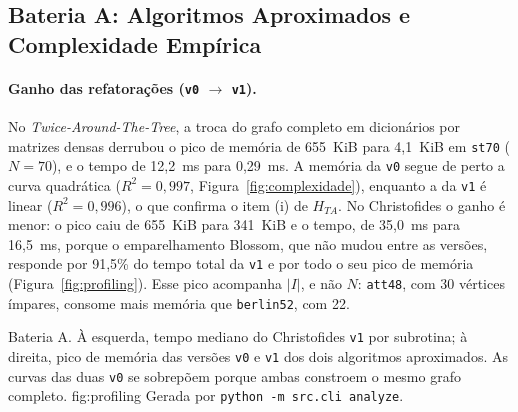 \subsection{Bateria A: Algoritmos Aproximados e Complexidade Empírica}
\label{sec:res_aproximados}

\paragraph{Ganho das refatorações (\texttt{v0} $\rightarrow$ \texttt{v1}).}
No \textit{Twice-Around-The-Tree}, a troca do grafo completo em dicionários por matrizes densas
derrubou o pico de memória de 655~KiB para 4,1~KiB em \texttt{st70} ($N = 70$), e o tempo de
12,2~ms para 0,29~ms. A memória da \texttt{v0} segue de perto a curva quadrática
($R^2 = 0{,}997$, Figura~\ref{fig:complexidade}), enquanto a da \texttt{v1} é linear
($R^2 = 0{,}996$), o que confirma o item (i) de $H_{TA}$. No Christofides o ganho é menor: o
pico caiu de 655~KiB para 341~KiB e o tempo, de 35,0~ms para 16,5~ms, porque o emparelhamento
Blossom, que não mudou entre as versões, responde por 91,5\% do tempo total da \texttt{v1} e por
todo o seu pico de memória (Figura~\ref{fig:profiling}). Esse pico acompanha $|I|$, e não $N$:
\texttt{att48}, com 30 vértices ímpares, consome mais memória que \texttt{berlin52}, com 22.

{Bateria A. À esquerda, tempo mediano do Christofides \texttt{v1} por subrotina; à direita, pico
de memória das versões \texttt{v0} e \texttt{v1} dos dois algoritmos aproximados. As curvas das
duas \texttt{v0} se sobrepõem porque ambas constroem o mesmo grafo completo.}
{fig:profiling}
{Gerada por \texttt{python -m src.cli analyze}.}


